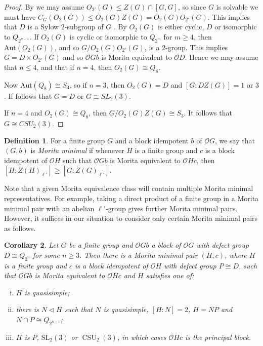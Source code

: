 \documentclass{amsart}
\theoremstyle{plain}\newtheorem{Theorem}{Theorem}[section]
\theoremstyle{plain}\newtheorem{Conjecture}[Theorem]{Conjecture}
\theoremstyle{plain}\newtheorem{Corollary}[Theorem]{Corollary}
\theoremstyle{plain}\newtheorem{Lemma}[Theorem]{Lemma}
\theoremstyle{plain}\newtheorem{Proposition}[Theorem]{Proposition}
\theoremstyle{definition}\newtheorem{Definition}[Theorem]{Definition}
\theoremstyle{definition}\newtheorem{Example}[Theorem]{Example}
\theoremstyle{definition}\newtheorem{Examples}[Theorem]{Examples}
\theoremstyle{definition}\newtheorem{Exercise}[Theorem]{Exercise}
\theoremstyle{definition}\newtheorem{Notation}[Theorem]{Notation}
\theoremstyle{definition}\newtheorem{Remark}[Theorem]{Remark}
\theoremstyle{definition}\newtheorem{Remarks}[Theorem]{Remarks}
\def\CO{{\mathcal{O}}}    \def\OPE{{\mathcal{O}(P\rtimes E)}}
\def\Aut{\mathrm{Aut}}               \def\tenk{\otimes_k}
\def\SL{\mathrm{SL}}
\numberwithin{equation}{section}
\begin{document}
\begin{proof}
By  we may assume $O_{2'}(G) \leq Z(G) \cap [G,G]$, so since $G$ is solvable we must have $C_G(O_2(G)) \leq O_2(G)Z(G)=O_2(G)O_{2'}(G)$. This implies that $D$ is a Sylow $2$-subgroup of $G$ \cite[Lem.~10.6.5]{LiBookII}. By  $O_2(G)$ is either cyclic, $D$ or isomorphic to $Q_{2^{n-1}}$. If $O_2(G)$ is cyclic or isomorphic to $Q_{2^m}$ for $m \geq 4$, then $\Aut(O_2(G))$, and so $G/O_2(G)O_{2'}(G)$, is a $2$-group. This implies $G=D \times O_{2'}(G)$ and so $\CO Gb$ is Morita equivalent to  $\CO D$. Hence we may assume that $n \leq 4$, and that if $n=4$, then $O_2(G) \cong Q_8$. 

Now $\Aut(Q_8) \cong S_4$, so if $n=3$, then $O_2(G)=D$ and $[G:DZ(G)]=1$ or $3$. If follows that $G=D$ or $G \cong SL_2(3)$.

If $n=4$ and $O_2(G) \cong Q_8$, then $G/O_2(G)Z(G) \cong S_3$. It follows that $G \cong CSU_2(3)$.
\end{proof}



\begin{Definition}
For a  finite group $G$ and  a block idempotent $b$ of $\CO G$, we say that  $(G,b)$ is {\it Morita minimal}  if  whenever
$H$ is a finite group and $c$ is a block idempotent of $\CO  H$ such that $\CO Gb$ is Morita equivalent to  $\CO Hc $, then
$[H:Z(H)_{\ell'}]\geq  [G:Z(G)_{\ell'}] $.
\end{Definition}

Note that a given Morita equivalence class will contain multiple Morita minimal representatives. For example, taking a direct product of a finite group in a Morita minimal pair with an abelian $\ell'$-group gives further Morita minimal pairs. However, it suffices in our situation to consider only certain Morita minimal pairs as follows.

\begin{Corollary}
Let $G$ be a finite group and $\CO Gb$ a block of $\CO G$ with defect group $D \cong Q_{2^n}$ for some $n \geq 3$. Then there is a Morita minimal pair $(H,c)$, where $H$ is a finite group and $c$ is a block idempotent of $\CO  H$ with defect group $P \cong D$, such that $\CO Gb$ is Morita equivalent to  $\CO Hc$ and $H$ satisfies one of:
\begin{enumerate}[(i)]
\item $H$ is quasisimple;
\item there is $N \lhd H$ such that $N$ is quasisimple, $[H:N]=2$, $H=NP$ and $N \cap P \cong Q_{2^{n-1}}$;
\item $H$ is $P$, $\SL_2(3)$ or $\operatorname{CSU}_2(3)$, in which cases $\CO Hc$ is the principal block.
\end{enumerate}
\end{Corollary}
\end{document}
